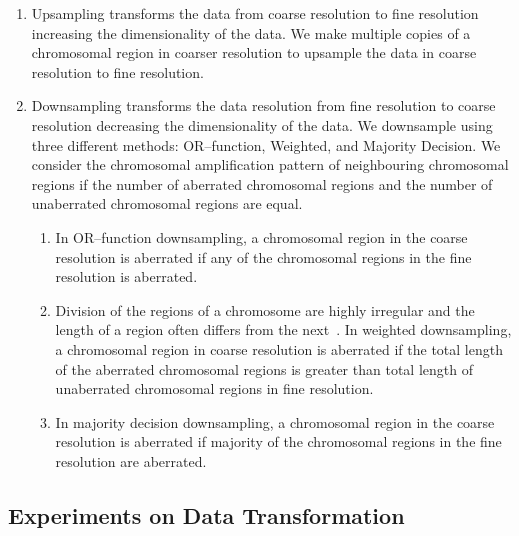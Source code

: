 \begin{enumerate}
\item Upsampling transforms the data from coarse resolution 
to fine resolution  increasing the dimensionality of the data.
We make multiple copies of a chromosomal region in coarser 
resolution to upsample the data in coarse resolution to fine 
resolution. 
\item Downsampling transforms the data resolution from fine 
resolution to coarse resolution  decreasing the dimensionality 
of the data. We downsample using three different methods:
OR--function, Weighted, and Majority Decision. We consider the
chromosomal amplification pattern of neighbouring chromosomal
regions if the number of  aberrated chromosomal regions and 
the number of unaberrated  chromosomal regions are equal.
\begin{enumerate}
\item In OR--function downsampling, a chromosomal region in the coarse
resolution is aberrated if any of the chromosomal regions in the fine 
resolution is aberrated.
\item Division of the regions of a chromosome are highly irregular 
and the length of a region  often differs from the 
next~\cite{shaffer05}. In weighted downsampling, a chromosomal 
region in coarse resolution is aberrated if the total length of the 
aberrated chromosomal regions is greater than total length of 
unaberrated chromosomal regions in fine resolution.
\item In majority decision downsampling, a chromosomal region in
the coarse resolution is aberrated if majority of the chromosomal
regions in the fine resolution are aberrated.
\end{enumerate}
\end{enumerate}

\subsection*{Experiments on Data Transformation}
\label{ss:DtaTransExp}

